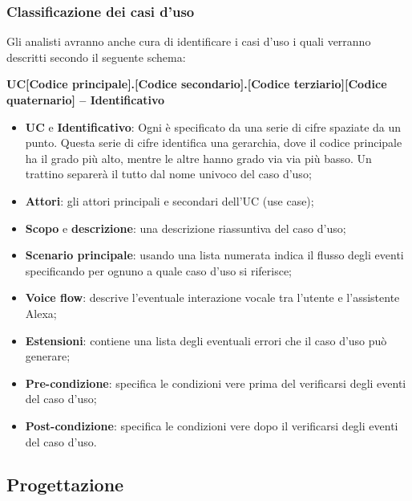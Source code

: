 \subsubsection{Classificazione dei casi d'uso}
Gli analisti avranno anche cura di identificare i casi d’uso i quali verranno descritti secondo il seguente schema:
\begin{center}
	\textbf{UC[Codice principale].[Codice secondario].[Codice terziario][Codice quaternario] – Identificativo}
\end{center}
\begin{itemize}
	\item \textbf{UC} e \textbf{Identificativo}: Ogni  è specificato da una serie di cifre spaziate da un punto. Questa serie di cifre identifica una gerarchia, dove il codice principale ha il grado più alto, mentre le altre hanno grado via via più basso. Un trattino separerà il tutto dal nome univoco del caso d’uso;
	\item \textbf{Attori}: gli attori principali e secondari dell’UC (use case);
	\item \textbf{Scopo} e \textbf{descrizione}: una descrizione riassuntiva del caso d’uso;
	\item \textbf{Scenario principale}: usando una lista numerata indica il flusso degli eventi specificando per ognuno a quale caso d’uso si riferisce;
	\item \textbf{Voice flow}: descrive l'eventuale interazione vocale tra l'utente e l'assistente Alexa;
	\item \textbf{Estensioni}: contiene una lista degli eventuali errori che il caso d'uso può generare;
	\item \textbf{Pre-condizione}: specifica le condizioni vere prima del verificarsi degli eventi del caso d’uso;
	\item \textbf{Post-condizione}: specifica le condizioni vere dopo il verificarsi degli eventi del caso d’uso.
\end{itemize}
\subsection{Progettazione}
\label{sec:progettazione}
